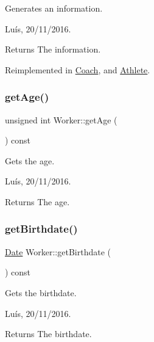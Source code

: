 Generates an information. 

Luís, 20/11/2016. 

\begin{DoxyReturn}{Returns}
The information. 
\end{DoxyReturn}


Reimplemented in \hyperlink{class_coach_a95f841d14e6994708a7f230a5d3a8d23}{Coach}, and \hyperlink{class_athlete_a44a5a7f1676c6ad2faca9bf51877a6f8}{Athlete}.

\hypertarget{class_worker_ae82fdc34f91e5f47dc709d97329a872f}{}\label{class_worker_ae82fdc34f91e5f47dc709d97329a872f} 
\subsubsection{\texorpdfstring{get\+Age()}{getAge()}}
{\footnotesize\ttfamily unsigned int Worker\+::get\+Age (\begin{DoxyParamCaption}{ }\end{DoxyParamCaption}) const}



Gets the age. 

Luís, 20/11/2016. 

\begin{DoxyReturn}{Returns}
The age. 
\end{DoxyReturn}
\hypertarget{class_worker_a43fb49c315c8c0a656924e8da285ddf9}{}\label{class_worker_a43fb49c315c8c0a656924e8da285ddf9} 
\subsubsection{\texorpdfstring{get\+Birthdate()}{getBirthdate()}}
{\footnotesize\ttfamily \hyperlink{class_date}{Date} Worker\+::get\+Birthdate (\begin{DoxyParamCaption}{ }\end{DoxyParamCaption}) const}



Gets the birthdate. 

Luís, 20/11/2016. 

\begin{DoxyReturn}{Returns}
The birthdate. 
\end{DoxyReturn}
\hypertarget{class_worker_a29fed9c10e4e9a8c1bd4cdfa41add2d2}{}\label{class_worker_a29fed9c10e4e9a8c1bd4cdfa41add2d2} 

